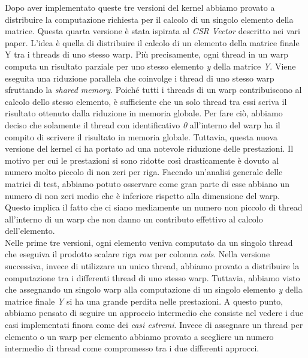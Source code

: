 \documentclass{article}
\begin{document}
Dopo aver implementato queste tre versioni del kernel abbiamo provato a distribuire la computazione richiesta per il calcolo di un singolo elemento della matrice. Questa quarta versione è stata ispirata al \textit{CSR Vector} descritto nei vari paper. L'idea è quella di distribuire il calcolo di un elemento della matrice finale Y tra i threads di uno stesso warp. Più precisamente, ogni thread in un warp computa un risultato parziale per uno stesso elemento \textit{y} della matrice \textit{Y}. Viene eseguita una riduzione parallela che coinvolge i thread di uno stesso warp sfruttando la \textit{shared memory}. Poiché tutti i threads di un warp contribuiscono al calcolo dello stesso elemento, è sufficiente che un solo thread tra essi scriva il risultato ottenuto dalla riduzione in memoria globale. Per fare ciò, abbiamo deciso che solamente il thread con identificativo \textit{0} all'interno del warp ha il compito di scrivere il risultato in memoria globale. Tuttavia, questa nuova versione del kernel ci ha portato ad una notevole riduzione delle prestazioni. Il motivo per cui le prestazioni si sono ridotte così drasticamente è dovuto al numero molto piccolo di non zeri per riga. Facendo un'analisi generale delle matrici di test, abbiamo potuto osservare come gran parte di esse abbiano un numero di non zeri medio che è inferiore rispetto alla dimensione del warp. Questo implica il fatto che ci siano mediamente un numero non piccolo di thread all'interno di un warp che non danno un contributo effettivo al calcolo dell'elemento.\\

Nelle prime tre versioni, ogni elemento veniva computato da un singolo thread che eseguiva il prodotto scalare riga \textit{row} per colonna \textit{cols}. Nella versione successiva, invece di utilizzare un unico thread, abbiamo provato a distribuire la computazione tra i differenti thread di uno stesso warp. Tuttavia, abbiamo visto che assegnando un singolo warp alla computazione di un singolo elemento \textit{y} della matrice finale \textit{Y} si ha una grande perdita nelle prestazioni. A questo punto, abbiamo pensato di seguire un approccio intermedio che consiste nel vedere i due casi implementati finora come dei \textit{casi estremi}. Invece di assegnare un thread per elemento o un warp per elemento abbiamo provato a scegliere un numero intermedio di thread come compromesso tra i due differenti approcci.\\
\end{document}
